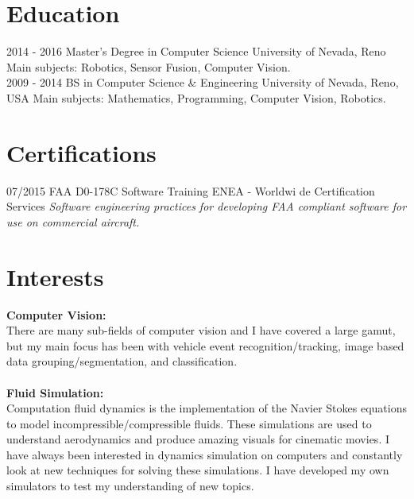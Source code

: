 \documentclass[]{friggeri-cv}
\begin{document}
\section{Education}
\begin{entrylist}
  \entry
    {2014 - 2016}
    {Master's Degree in Computer Science}
    {University of Nevada, Reno}
    {Main subjects: Robotics, Sensor Fusion, Computer Vision.\\}
  \entry
    {2009 - 2014}
    {BS in Computer Science \& Engineering}
    {University of Nevada, Reno, USA}
    {Main subjects: Mathematics, Programming, Computer Vision, Robotics.\\}
\end{entrylist}

\section{Certifications}
\begin{entrylist}
  \entry
    {07/2015}
    {FAA D0-178C Software Training}
    {ENEA - Worldwi de Certification Services}
    {\emph{Software engineering practices for developing FAA compliant software for use on commercial aircraft.}}
\end{entrylist}

\section{Interests}
    {\textbf{Computer Vision:}}\\
    {There are many sub-fields of computer vision and I have covered a large gamut, but my main focus has been with vehicle event recognition/tracking, image based data grouping/segmentation, and classification.}\\ \\
    {\textbf{Fluid Simulation:}}\\
    {Computation fluid dynamics is the implementation of the Navier Stokes equations to model incompressible/compressible fluids. These simulations are used to understand aerodynamics and produce amazing visuals for cinematic movies. I have always been interested in dynamics simulation on computers and constantly look at new techniques for solving these simulations. I have developed my own simulators to test my understanding of new topics.}
\end{document}
